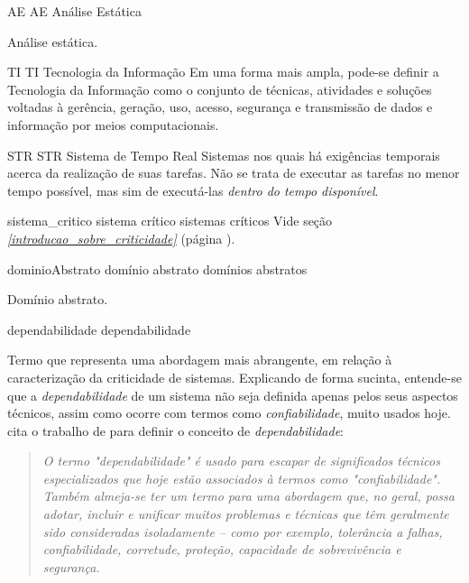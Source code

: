\novoacronimo
    {AE} %
    {AE} %
    {{Análise Estática}} %
    {
        Análise estática.
        
    }

\novoacronimo
    {TI}
    {TI}
    {{Tecnologia da Informação}}
    {
        Em uma forma mais ampla, pode-se definir a Tecnologia da 
        Informação como o conjunto de técnicas, atividades e soluções voltadas 
        à gerência, geração, uso, acesso, segurança e transmissão de dados e 
        informação por meios computacionais.
    }

\novoacronimo
    {STR}
    {STR}
    {{Sistema de Tempo Real}}
    {
        Sistemas nos quais há exigências temporais acerca da realização de suas 
        tarefas. Não se trata de executar as tarefas no menor tempo possível, 
        mas sim de executá-las \emph{dentro do tempo disponível}.
    }


\novadefinicaopl
    {sistema_critico}
    {sistema crítico}
    {sistemas críticos}
    {
        Vide seção \emph{\ref{introducao_sobre_criticidade}} (página 
        \pageref{introducao_sobre_criticidade}).
    }

\novadefinicaopl
    {dominioAbstrato}
    {domínio abstrato}
    {domínios abstratos}
    {
        Domínio abstrato.
        
    }

\novadefinicao
    {dependabilidade}
    {dependabilidade}
    {
        Termo que representa uma abordagem mais abrangente, em relação à 
        caracterização da criticidade de sistemas. Explicando de forma sucinta, 
        entende-se que a \emph{dependabilidade} de um sistema não 
        seja definida apenas pelos seus aspectos técnicos, assim como 
        ocorre com termos como \emph{confiabilidade}, muito usados 
        hoje. \citeauthor{rushby_critical_1994} cita o trabalho de 
         para definir o conceito 
        de \emph{dependabilidade}:
        \blockquote{\textit{
            O termo \emph{"dependabilidade"} é usado para escapar de 
            significados técnicos especializados que hoje estão 
            associados à termos como \emph{"confiabilidade"}. Também almeja-se 
            ter um termo para uma abordagem que, no geral, possa adotar, 
            incluir e unificar muitos problemas e técnicas que têm geralmente 
            sido consideradas isoladamente -- como por exemplo, tolerância a 
            falhas, confiabilidade, corretude, proteção, capacidade de 
            sobrevivência e segurança.} \cite{rushby_critical_1994}
        }
    }

